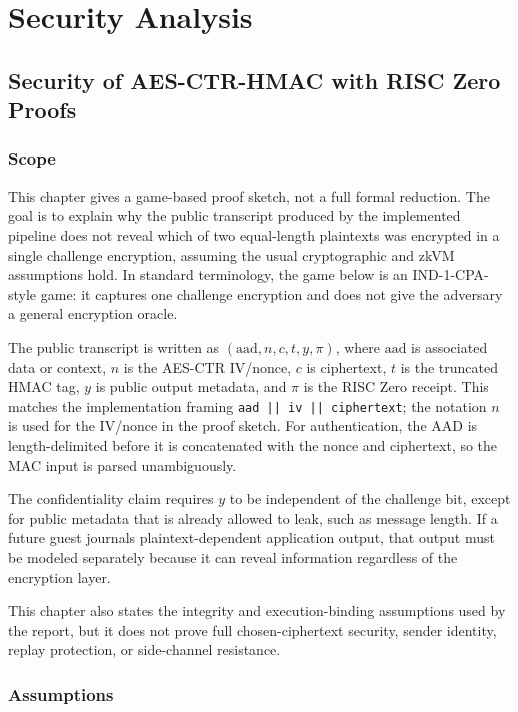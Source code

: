 \chapter{Security Analysis}

\section{Security of AES-CTR-HMAC with RISC Zero Proofs}

\subsection{Scope}

This chapter gives a game-based proof sketch, not a full formal reduction. The
goal is to explain why the public transcript produced by the implemented
pipeline does not reveal which of two equal-length plaintexts was encrypted in a
single challenge encryption, assuming the usual cryptographic and zkVM
assumptions hold. In standard terminology, the game below is an
IND-1-CPA-style game: it captures one challenge encryption and does not give the
adversary a general encryption oracle.

The public transcript is written as
\((\mathrm{aad}, n, c, t, y, \pi)\), where \(\mathrm{aad}\) is associated data or
context, \(n\) is the AES-CTR IV/nonce, \(c\) is ciphertext, \(t\) is the
truncated HMAC tag, \(y\) is public output metadata, and \(\pi\) is the RISC Zero
receipt. This matches the implementation framing
\texttt{aad || iv || ciphertext}; the notation \(n\) is used for the IV/nonce in
the proof sketch. For authentication, the AAD is length-delimited before it is
concatenated with the nonce and ciphertext, so the MAC input is parsed
unambiguously.

The confidentiality claim requires \(y\) to be independent of the challenge bit,
except for public metadata that is already allowed to leak, such as message
length. If a future guest journals plaintext-dependent application output, that
output must be modeled separately because it can reveal information regardless of
the encryption layer.

This chapter also states the integrity and execution-binding assumptions used by
the report, but it does not prove full chosen-ciphertext security, sender
identity, replay protection, or side-channel resistance.

\subsection{Assumptions}

